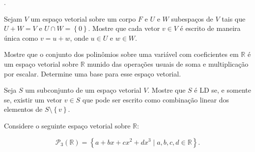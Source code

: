 \begin{questions}
\begin{solutionordottedlines}
\begin{parts}
			.
		\end{parts}
	\end{solutionordottedlines}

	\question\label{exercício:2.4}

	Sejam $V$ um espaço vetorial sobre um corpo $F$ e $U$ e $W$
	subespaços de $V$ tais que $U+W=V$ e $U \cap W=\left\{0\right\}$.
	Mostre que cada vetor $v\in V$ é escrito de maneira única como
	$v=u+w$, onde $u\in U$ e $w\in W$.

	\begin{solutionordottedlines}
	\end{solutionordottedlines}

	\question\label{exercício:2.5}

	Mostre que o conjunto dos polinômios sobre uma variável com
	coeficientes em $\mathbb{R}$ é um espaço vetorial sobre
	$\mathbb{R}$ munido das operações usuais de soma e multiplicação
	por escalar.
	Determine uma base para esse espaço vetorial.

	\begin{solutionordottedlines}
	\end{solutionordottedlines}

	\question\label{exercício:2.6}

	Seja $S$ um subconjunto de um espaço vetorial $V$.
	Mostre que $S$ é LD se, e somente se, existir um vetor $v\in S$ que
	pode ser escrito como combinação linear dos elementos de
	$S\setminus\left\{v\right\}$.

	\begin{solutionordottedlines}
	\end{solutionordottedlines}

	\question\label{exercício:2.7}

	Considere o seguinte espaço vetorial sobre $\mathbb{R}$:

	\[
		\mathcal{P}_{3}
		\left(\mathbb{R}\right)=
		\left\{
		a+bx+cx^{2}+dx^{3}\mid
		a,b,c,d\in\mathbb{R}
		\right\}.
	\]

\end{questions}
